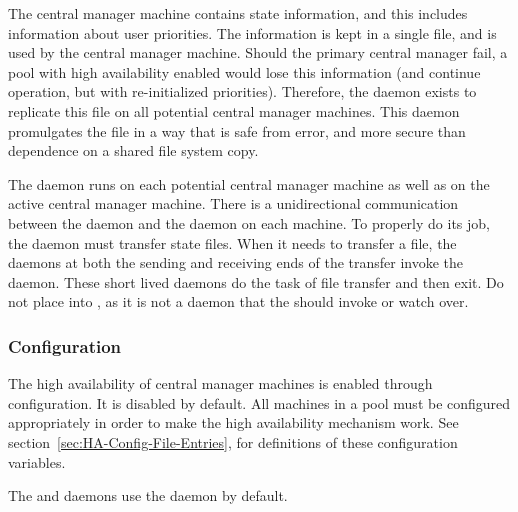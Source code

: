 The central manager machine contains state information,
and this includes information about user priorities.
The information is kept in a single file, 
and is used by the central manager machine.
Should the primary central manager fail,
a pool with high availability enabled would lose this information
(and continue operation, but with re-initialized priorities). 
Therefore, the  daemon exists
to replicate this file on all potential central manager machines.
This daemon promulgates the file in a way that is safe from error,
and more secure than dependence on a shared file system copy.

The  daemon runs on each
potential central manager machine as well as on
the active central manager machine.
There is a unidirectional communication between the 
daemon and the  daemon on each machine.
To properly do its job, the  daemon must
transfer state files.
When it needs to transfer a file,
the  daemons at both the sending and receiving
ends of the transfer invoke the  daemon.
These short lived daemons do the task of file transfer and then exit.
Do not place  into ,
as it is not a daemon that the  should invoke or
watch over.

\subsubsection{\label{sec:HA-configuration} Configuration} 

The high availability of central manager machines is
enabled through configuration.
It is disabled by default.
All machines in a pool must be configured appropriately
in order to make the high availability mechanism work.
See
section~\ref{sec:HA-Config-File-Entries},
for definitions of these configuration variables.

The  and  daemons use the
 daemon by default.

